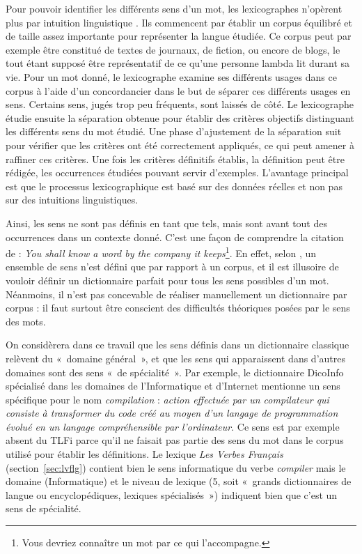 Pour pouvoir identifier les différents sens d'un mot, les lexicographes
n'opèrent plus par intuition linguistique \citep{kilgarriff1997don}. Ils
commencent par établir un corpus équilibré et de taille assez importante pour
représenter la langue étudiée. Ce corpus peut par exemple être constitué de
textes de journaux, de fiction, ou encore de blogs, le tout étant supposé être
représentatif de ce qu'une personne lambda lit durant sa vie. Pour un mot
donné, le lexicographe examine ses différents usages dans ce corpus à l'aide
d'un concordancier dans le but de séparer ces différents usages en sens.
Certains sens, jugés trop peu fréquents, sont laissés de côté. Le lexicographe
étudie ensuite la séparation obtenue pour établir des critères objectifs
distinguant les différents sens du mot étudié. Une phase d'ajustement de la
séparation suit pour vérifier que les critères ont été correctement appliqués,
ce qui peut amener à raffiner ces critères. Une fois les critères définitifs
établis, la définition peut être rédigée, les occurrences étudiées pouvant
servir d'exemples. L'avantage principal est que le processus lexicographique
est basé sur des données réelles et non pas sur des intuitions linguistiques.

Ainsi, les sens ne sont pas définis en tant que tels, mais sont avant tout des
occurrences dans un contexte donné. C'est une façon de comprendre la citation
de \citep{firth1957synopsys} : \textit{You shall know a word by the company it
keeps}\footnote{Vous devriez connaître un mot par ce qui l'accompagne.}. En
effet, selon \citep{kilgarriff1997don}, un ensemble de sens n'est défini que
par rapport à un corpus, et il est illusoire de vouloir définir un dictionnaire
parfait pour tous les sens possibles d'un mot. Néanmoins, il n'est pas
concevable de réaliser manuellement un dictionnaire par corpus : il faut
surtout être conscient des difficultés théoriques posées par le sens des mots.

On considèrera dans ce travail que les sens définis dans un dictionnaire
classique relèvent du «~domaine général~», et que les sens qui apparaissent
dans d'autres domaines sont des sens «~de spécialité~». Par exemple, le
dictionnaire DicoInfo \citep{corpusolst} spécialisé dans les domaines de
l'Informatique et d'Internet mentionne un sens spécifique pour le nom
\textit{compilation} : \textit{action effectuée par un compilateur qui consiste à
    transformer du code créé au moyen d'un langage de programmation évolué en
un langage compréhensible par l'ordinateur}. Ce sens est par exemple absent du
TLFi \citep{TLFi} parce qu'il ne faisait pas partie des sens du mot dans le
corpus utilisé pour établir les définitions. Le lexique \textit{Les Verbes
Français} (section~\ref{sec:lvflg}) contient bien le sens informatique du verbe
\textit{compiler} mais le domaine (Informatique) et le niveau de lexique (5, soit
«~grands dictionnaires de langue ou encyclopédiques, lexiques spécialisés~»)
indiquent bien que c'est un sens de spécialité.


